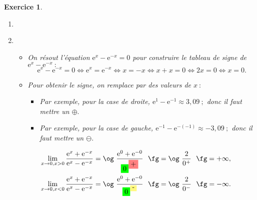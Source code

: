 \documentclass[10pt]{article}
\newtheorem{exo}{Exercice}
\newcommand\setItemnumber[1]{\setcounter{enumi}{\numexpr#1-1\relax}}
\begin{document}
\begin{exo}
\begin{enumerate}
\setItemnumber{5}
\item \item ~{}

\begin{itemize}
\item[\textbullet] On résout l'équation $\text{e}^{x}-\text{e}^{-x}=0$ pour construire le tableau de signe de $\text{e}^{x}-\text{e}^{-x}~:$
\[\text{e}^{x}-\text{e}^{-x}=0\iff \text{e}^{x}=\text{e}^{-x}\iff x=-x\iff x+x=0\iff 2x=0\iff x=0.\]

\item[\textbullet] Pour obtenir le signe, on remplace par des valeurs de $x~:$
\begin{itemize}
\item Par exemple, pour la case de droite, $\text{e}^{1}-\text{e}^{-1}\approx 3,09~;$ donc il faut mettre un $\oplus.$
\item Par exemple, pour la case de gauche, $\text{e}^{-1}-\text{e}^{-(-1)}\approx -3,09~;$ donc il faut mettre un $\ominus.$
\end{itemize}
\end{itemize}

\begin{center}
\newcommand*{\z}{\colorbox{green}{$0$}}
\end{center}

\begin{align*}
\lim\limits_{x\to 0,x>0}\frac{\text{e}^{x}+\text{e}^{-x}}{\text{e}^{x}-\text{e}^{-x}}&=\text{\og}~\frac{\text{e}^{0}+\text{e}^{-0}}{\colorbox{green}{0}^{\colorbox{red!50}{+}}}~\text{ \fg}=\text{\og}~\frac{2}{0^+}~\text{ \fg}=+\infty,
\\
\lim\limits_{x\to 0,x<0}\frac{\text{e}^{x}+\text{e}^{-x}}{\text{e}^{x}-\text{e}^{-x}}&=\text{\og}~\frac{\text{e}^{0}+\text{e}^{-0}}{\colorbox{green}{0}^{\colorbox{yellow!50}{-}}}~\text{ \fg}=\text{\og}~\frac{2}{0^-}~\text{ \fg}=-\infty.
\end{align*}


\end{enumerate}


\end{exo}
\end{document}
